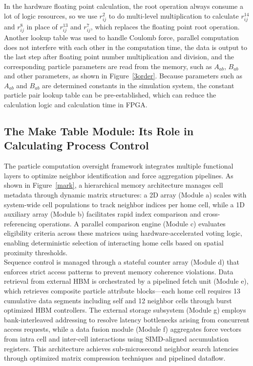 \documentclass{article}
\begin{document}
In the hardware floating point calculation, the root operation always consume a 
lot of logic resources, so we use $r_{ij}^2$ to do multi-level multiplication to 
calculate $r_{ij}^{14}$ and $r_{ij}^{8}$ in place of $r_{ij}^{13}$ and $r_{ij}^{7}$, which replaces 
the floating point root operation. 
Another lookup table was used to handle Coulomb force, parallel computation 
does not interfere with each other in the computation time, the data is 
output to the last step after floating point number multiplication and 
division, and the corresponding particle parameters are read from the memory, 
such as $A_{ab}$, $B_{ab}$ and other parameters, as shown in 
Figure~\ref{3order}. 
Because parameters such as $A_{ab}$ and $B_{ab}$ are determined constants in the 
simulation system, the constant particle pair lookup table can be 
pre-established, which can reduce the calculation logic and calculation time in 
FPGA.

\subsection{The Make Table Module: Its Role in Calculating Process Control}

\noindent 
The particle computation oversight framework integrates multiple functional 
layers to optimize neighbor identification and force aggregation pipelines.
As shown in Figure~\ref{mark}, a hierarchical memory architecture manages cell 
metadata through dynamic matrix structures: a 2D array (Module a) scales with 
system-wide cell populations to track neighbor indices per home cell, while a 
1D auxiliary array (Module b) facilitates rapid index comparison and 
cross-referencing operations. 
A parallel comparison engine (Module c) evaluates eligibility criteria across 
these matrices using hardware-accelerated voting logic, enabling deterministic 
selection of interacting home cells based on spatial proximity thresholds.\\

\noindent
Sequence control is managed through a stateful counter array (Module d) that 
enforces strict access patterns to prevent memory coherence violations. 
Data retrieval from external HBM is orchestrated by a 
pipelined fetch unit (Module e), which retrieves composite particle attribute 
blocks—each home cell requires 13 cumulative data segments including self and 
12 neighbor cells through burst optimized HBM controllers. 
The external storage subsystem (Module g) employs bank-interleaved addressing 
to resolve latency bottlenecks arising from concurrent access requests, while a 
data fusion module (Module f) aggregates force vectors from intra cell and 
inter-cell interactions using SIMD-aligned accumulation registers.
This architecture achieves sub-microsecond neighbor search latencies through 
optimized matrix compression techniques and pipelined dataflow.\\
\end{document}
